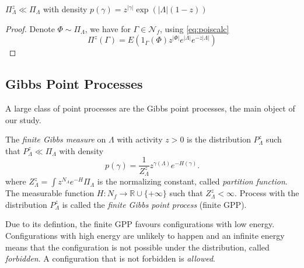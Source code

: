 \begin{proposition} $\Pi_\Lambda^z \ll \Pi_\Lambda$ with density $p(\gamma)=z^{|\gamma|} \exp(|\Lambda|(1-z))$
\end{proposition}
\begin{proof}
	Denote $\Phi \sim \Pi_\Lambda$, we have for $\Gamma\in \mathcal N_{f}$, using \ref{eq:poiscalc}
	$$\Pi^z(\Gamma) = E(1_\Gamma(\Phi)  z^{|\Phi|} e^{|\Lambda|} e^{-z|\Lambda|}) $$
\end{proof}

\subsection{Gibbs Point Processes}

A large class of point processes are the Gibbs point processes, the main object of our study.

\begin{definition}\label{def:fGPP}
The \textit{finite Gibbs measure} on $\Lambda$ with activity $z>0$ is the distribution $P^z_\Lambda$ such that $P^z_\Lambda \ll \Pi_\Lambda$ with density
$$p(\gamma) = \frac 1{Z^{z}_\Lambda} z^{\gamma(\Lambda)} e^{-H(\gamma)}.$$
where  $Z^z_\Lambda = \int z^{N_\Lambda} e^{-H} \Pi_\Lambda$ is the normalizing constant, called \textit{partition function}. \newline
The measurable function $H:N_f\to \mathbb R \cup \{+\infty\}$ such that $Z^z_\Lambda < \infty$. \newline
Process with the distribution $P^z_{\Lambda}$ is called the \textit{finite Gibbs point process} (finite GPP). 
\end{definition}


Due to its defintion, the finite GPP favours configurations with low energy. Configurations with high energy are unlikely to happen and an infinite energy means that the configuration is not possible under the distribution, called \textit{forbidden}. A configuration that is not forbidden is \textit{allowed}. 

